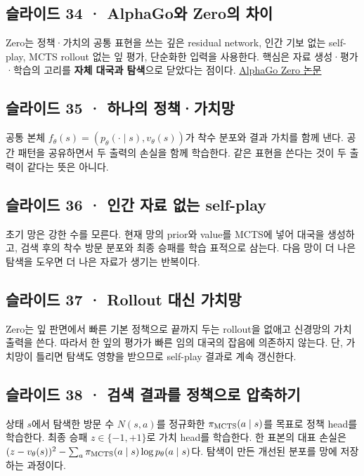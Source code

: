 \documentclass[11pt,a4paper]{article}
\begin{document}
\subsection{슬라이드 34 · AlphaGo와 Zero의 차이}

Zero는 정책·가치의 공통 표현을 쓰는 깊은 residual network, 인간 기보 없는 self-play, MCTS rollout 없는 잎 평가, 단순화한 입력을 사용한다. 핵심은 자료 생성·평가·학습의 고리를 \textbf{자체 대국과 탐색}으로 닫았다는 점이다. \href{https://www.nature.com/articles/nature24270}{AlphaGo Zero 논문}\par

\subsection{슬라이드 35 · 하나의 정책·가치망}

공통 본체 $f_\theta(s)=(p_\theta(\cdot\mid s),v_\theta(s))$가 착수 분포와 결과 가치를 함께 낸다. 공간 패턴을 공유하면서 두 출력의 손실을 함께 학습한다. 같은 표현을 쓴다는 것이 두 출력이 같다는 뜻은 아니다.\par

\subsection{슬라이드 36 · 인간 자료 없는 self-play}

초기 망은 강한 수를 모른다. 현재 망의 prior와 value를 MCTS에 넣어 대국을 생성하고, 검색 후의 착수 방문 분포와 최종 승패를 학습 표적으로 삼는다. 다음 망이 더 나은 탐색을 도우면 더 나은 자료가 생기는 반복이다.\par

\subsection{슬라이드 37 · Rollout 대신 가치망}

Zero는 잎 판면에서 빠른 기본 정책으로 끝까지 두는 rollout을 없애고 신경망의 가치 출력을 쓴다. 따라서 한 잎의 평가가 빠른 임의 대국의 잡음에 의존하지 않는다. 단, 가치망이 틀리면 탐색도 영향을 받으므로 self-play 결과로 계속 갱신한다.\par

\subsection{슬라이드 38 · 검색 결과를 정책으로 압축하기}

상태 $s$에서 탐색한 방문 수 $N(s,a)$를 정규화한 $\pi_{\rm MCTS}(a\mid s)$를 목표로 정책 head를 학습한다. 최종 승패 $z\in\{-1,+1\}$로 가치 head를 학습한다. 한 표본의 대표 손실은 $(z-v_\theta(s))^2-\sum_a\pi_{\rm MCTS}(a\mid s)\log p_\theta(a\mid s)$다. 탐색이 만든 개선된 분포를 망에 저장하는 과정이다.\par
\end{document}
